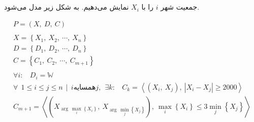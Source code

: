 \documentclass{article}
\begin{document}
\subsection{}
جمعیت شهر $i$ را با $X_{i}$ نمایش می‌دهیم.  به شکل زیر مدل می‌شود.\\
\begin{fleqn}
\begin{equation}
\begin{aligned}
P = (X,\:D,\:C) \\ \\
X = \left\{ X_{1},\:X_{2},\:\cdots ,\:X_{n} \right\} \\
D = \left\{ D_{1},\:D_{2},\:\cdots ,\:D_{n} \right\} \\
C = \left\{ C_{1},\:C_{2},\:\cdots ,\:C_{m+1} \right\} \\ \\
\forall i:\:\:\:\:D_{i} = \mathbb{W} \\
\forall \:\: 1 \le i \leq j \le n \:\: | \:\: i \text{همسایه} j, \:\: \exists k: \:\:\:\:C_{k} = \left\langle \left( X_{i},\:X_{j} \right),\: \left| X_{i} - X_{j} \right| \ge 2000 \right\rangle\\
C_{m+1} = \left\langle \left( X_{\arg\: \max_{i}\left\{ X_{i} \right\}},\:X_{\arg\: \min_{j}\left\{ X_{j} \right\}} \right),\: \max_{i}\left\{ X_{i} \right\} \le 3\min_{j}\left\{ X_{j} \right\} \right\rangle
\end{aligned}
\end{equation}
\end{fleqn}
\end{document}
